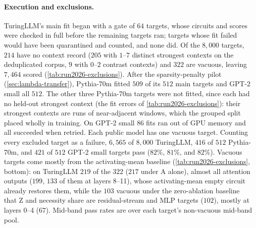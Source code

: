 \documentclass[10pt]{article}
\begin{document}
\paragraph{Execution and exclusions.}
TuringLLM's main fit began with a gate of $64$ targets, whose circuits and scores were checked in full before the remaining targets ran; targets whose fit failed would have been quarantined and counted, and none did.
Of the $8{,}000$ targets, $214$ have no context record ($205$ with $1$--$7$ distinct strongest contexts on the deduplicated corpus, $9$ with $0$--$2$ contrast contexts) and $322$ are vacuous, leaving $7{,}464$ scored (\cref{tab:run2026-exclusions}).
After the sparsity-penalty pilot (\cref{sec:lambda-transfer}), Pythia-70m fitted $509$ of its $512$ main targets and GPT-2 small all $512$.
The other three Pythia-70m targets were not fitted, since each had no held-out strongest context (the fit errors of \cref{tab:run2026-exclusions}): their strongest contexts are runs of near-adjacent windows, which the grouped split placed wholly in training. On GPT-2 small $86$ fits ran out of GPU memory and all succeeded when retried. Each public model has one vacuous target.
Counting every excluded target as a failure, $6{,}565$ of $8{,}000$ TuringLLM, $416$ of $512$ Pythia-70m, and $421$ of $512$ GPT-2 small targets pass ($82\%$, $81\%$, and $82\%$).
Vacuous targets come mostly from the activating-mean baseline (\cref{tab:run2026-exclusions}, bottom): on TuringLLM $219$ of the $322$ ($217$ under A alone), almost all attention outputs ($199$, $133$ of them at layers 8--11), whose activating-mean empty circuit already restores them, while the $103$ vacuous under the zero-ablation baseline that Z and necessity share are residual-stream and MLP targets ($102$), mostly at layers 0--4 ($67$).
Mid-band pass rates are over each target's non-vacuous mid-band pool.
\end{document}
